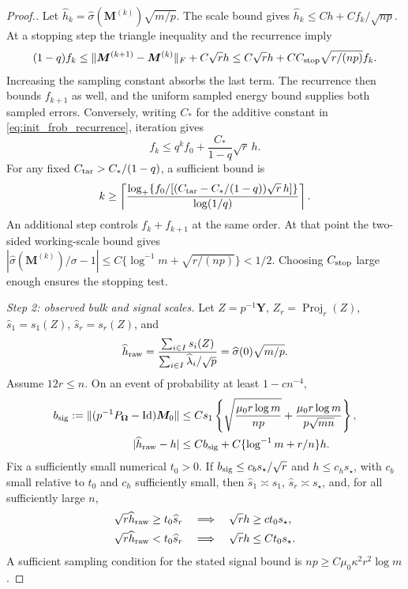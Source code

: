 \documentclass[numsec,webpdf,modern,large,namedate]{oup-authoring-template}
\theoremstyle{plain}
\theoremstyle{remark}
\newcommand{\M}{\bm{M}}
\newcommand{\Y}{\bm{Y}}
\newcommand{\bOmega}{\bm{\Omega}}
\newif\ifmarkchanges
\newenvironment{revision}{\begingroup\ifmarkchanges\color{red}\fi}{\endgroup}
\begin{document}
\begin{revision}
\begin{proof}[Proof.]
Let $\widehat h_k=\widehat\sigma(\M^{(k)})\sqrt{m/p}$.
The scale bound gives $\widehat h_k\le Ch+C f_k/\sqrt{np}$.
At a stopping step the triangle inequality and the recurrence imply
\[
 (1-q)f_k\le\|\M^{(k+1)}-\M^{(k)}\|_F+C\sqrt r h
 \le C\sqrt r h+C C_{\rm stop}\sqrt{r/(np)}f_k.
\]
Increasing the sampling constant absorbs the last term.
The recurrence then bounds $f_{k+1}$ as well, and the uniform sampled
energy bound supplies both sampled errors.  Conversely, writing $C_*$ for the additive constant in
\eqref{eq:init_frob_recurrence}, iteration gives
\[
 f_k\le q^k f_0+\frac{C_*}{1-q}\sqrt r\,h.
\]
For any fixed $C_{\rm tar}>C_* /(1-q)$, a sufficient bound is
\begin{align}
 k\ge
 \left\lceil
 \frac{\log_+\{f_0/[(C_{\rm tar}-C_* /(1-q))\sqrt r\,h]\}}
      {\log(1/q)}
 \right\rceil.
 \label{eq:initialization_iteration_complexity}
\end{align}
An additional step controls $f_k+f_{k+1}$ at the same order.
At that point the two-sided working-scale bound gives
$|\widehat\sigma(\M^{(k)})/\sigma-1|
\le C\{\log^{-1}m+\sqrt{r/(np)}\}<1/2$.
Choosing $C_{\rm stop}$ large enough ensures the stopping test.

\textit{Step 2: observed bulk and signal scales.} Let $Z=p^{-1}\Y$, $Z_r=\operatorname{Proj}_r(Z)$,
$\widehat s_1=s_1(Z)$, $\widehat s_r=s_r(Z)$, and
\begin{align}
 \widehat h_{\rm raw}
 =\frac{\sum_{i\in I}s_i(Z)}{\sum_{i\in I}\widehat\lambda_i/\sqrt p}
 =\widehat\sigma(0)\sqrt{m/p}.
 \label{eq:init_raw_bulk_scale}
\end{align}
Assume $12r\le n$.  On an event of probability at least $1-cn^{-4}$,
\begin{align}
 b_{\rm sig}:=\|(p^{-1}P_{\bOmega}-\operatorname{Id})\M_0\|
 &\le Cs_1\left\{\sqrt{\frac{\mu_0r\log m}{np}}+
            \frac{\mu_0r\log m}{p\sqrt{mn}}\right\},
 \label{eq:init_signal_concentration}\\
 |\widehat h_{\rm raw}-h|
 &\le C b_{\rm sig}+C\{\log^{-1}m+r/n\}h.
 \label{eq:init_raw_scale_error}
\end{align}
Fix a sufficiently small numerical $t_0>0$.  If
$b_{\rm sig}\le c_b s_\star/\sqrt r$ and $h\le c_hs_\star$, with
$c_b$ small relative to $t_0$ and $c_h$ sufficiently small, then
$\widehat s_1\asymp s_1$, $\widehat s_r\asymp s_\star$, and, for
all sufficiently large $n$,
\begin{align}
 \sqrt r\widehat h_{\rm raw}\ge t_0\widehat s_r
 &\quad\Longrightarrow\quad \sqrt r h\ge c t_0s_\star,
 \label{eq:init_large_branch}\\
 \sqrt r\widehat h_{\rm raw}<t_0\widehat s_r
 &\quad\Longrightarrow\quad \sqrt r h\le C t_0s_\star.
 \label{eq:init_small_branch}
\end{align}
A sufficient sampling condition for the stated signal bound is
$np\ge C\mu_0\kappa^2r^2\log m$.


\end{proof}
\end{revision}
\end{document}
